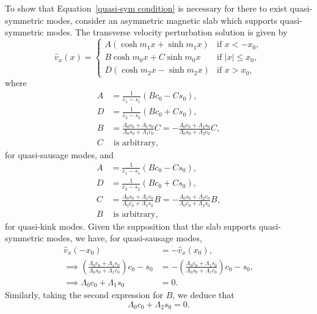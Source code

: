 \documentclass[12pt,draft]{../style-files/ociamthesis}
\begin{document}
To show that Equation~\eqref{quasi-sym condition} is necessary for there to exist quasi-symmetric modes, consider an asymmetric magnetic slab which supports quasi-symmetric modes. The transverse velocity perturbation solution is given by
\begin{equation}
\hat{v}_x(x) =
\begin{cases}
A(\cosh{m_1x} + \sinh{m_1x}) & \text{if } x < -x_0, \\
B\cosh{m_0x} + C\sinh{m_0x} & \text{if } |x| \leq x_0, \\
D(\cosh{m_2x} - \sinh{m_2x}) & \text{if } x > x_0, \label{vsoln}
\end{cases}
\end{equation}
where
\begin{align}
A &= \frac{1}{c_1 - s_1}(Bc_0 - Cs_0), \label{constA C} \\ 
D &= \frac{1}{c_2 - s_2}(Bc_0 + Cs_0), \label{constD C} \\
B &= \frac{\Lambda_0c_0 + \Lambda_1s_0}{\Lambda_0s_0 + \Lambda_1c_0}C = -\frac{\Lambda_0c_0 + \Lambda_2s_0}{\Lambda_0s_0 + \Lambda_2c_0}C, \label{constB C} \\
C & \text{ is arbitrary},
\end{align}
for quasi-sausage modes, and
\begin{align}
A &= \frac{1}{c_1 - s_1}(Bc_0 - Cs_0), \label{constA B} \\ 
D &= \frac{1}{c_2 - s_2}(Bc_0 + Cs_0), \label{constD B} \\
C &= \frac{\Lambda_0s_0 + \Lambda_1c_0}{\Lambda_0c_0 + \Lambda_1s_0}B = -\frac{\Lambda_0s_0 + \Lambda_2c_0}{\Lambda_0c_0 + \Lambda_2s_0}B, \label{constB B} \\
B & \text{ is arbitrary},
\end{align}
for quasi-kink modes. Given the supposition that the slab supports quasi-symmetric modes, we have, for quasi-sausage modes,
\begin{align}
\hat{v}_x(-x_0) &= -\hat{v}_x(x_0), \\
\implies \left(\frac{\Lambda_0c_0 + \Lambda_1s_0}{\Lambda_0s_0 + \Lambda_1c_0}\right) c_0 - s_0 &= -\left(\frac{\Lambda_0c_0 + \Lambda_1s_0}{\Lambda_0s_0 + \Lambda_1c_0}\right)c_0 - s_0, \\
\implies \Lambda_0c_0 + \Lambda_1s_0 &= 0. \label{quasi-sym proof 1}
\end{align}
Similarly, taking the second expression for $B$, we deduce that 
\begin{equation}
\Lambda_0c_0 + \Lambda_2s_0 = 0. \label{quasi-sym proof 2}
\end{equation}
\end{document}
